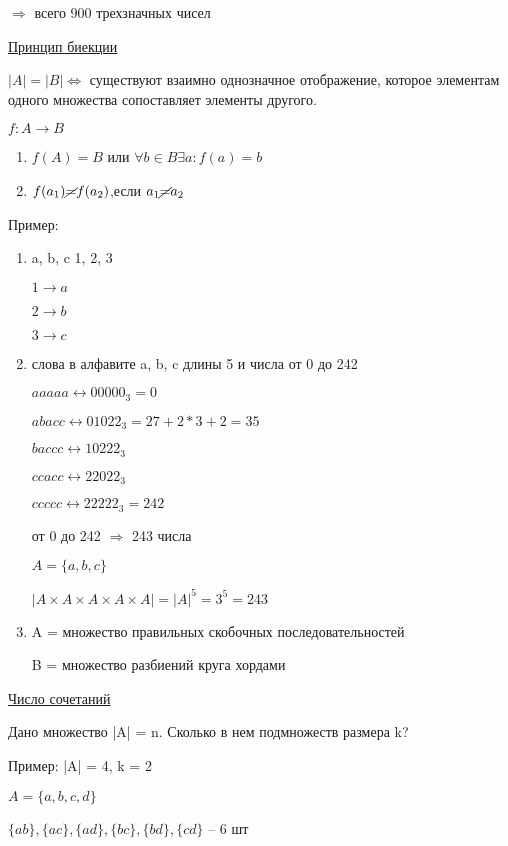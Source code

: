 \documentclass{article}
\begin{document}
$\Rightarrow$	всего 900 трехзначных чисел



\underline{Принцип биекции}

$|A| = |B|  \Leftrightarrow$  существуют взаимно однозначное отображение, которое элементам одного множества сопоставляет элементы другого.

$f:   A \rightarrow B$ 
\begin{enumerate}
	\item $f(A)= B$ или $\forall b\in B \exists a : f(a) = b$
	\item $f(a_1 ) \cancel = f(a_2 )$,если $a_1 \cancel = a_2$  
\end{enumerate}


Пример:
\begin{enumerate}
\item  {a, b, c} {1, 2, 3}

$1 \rightarrow a $

$2 \rightarrow b $

$3 \rightarrow c $

\item 	слова в алфавите a, b, c длины 5 и числа от 0 до 242

 $aaaaa \leftrightarrow 00000_3 = 0$
 
$abacc \leftrightarrow 01022_3 = 27 + 2 \ast 3 + 2 = 35 $

$baccc \leftrightarrow 10222_3 $

$ccacc \leftrightarrow 22022_3  $

$ccccc \leftrightarrow 22222_3 = 242 $

от 0 до 242 $\Rightarrow$  243 числа 

$A = \{a, b, c\}$

$|A \times A \times A \times A \times A|=|A|^5= 3^5=243 $

\item A = множество правильных скобочных последовательностей

B = множество разбиений круга хордами

\end{enumerate}

\underline{Число сочетаний}

Дано множество |A| = n. Сколько в нем подмножеств размера k?

Пример: |A| = 4, k = 2

$A = \{a, b, c, d\}$

$\{ab\}, \{ac\}, \{ad\}, \{bc\}, \{bd\}, \{cd\}$ – 6 шт
\end{document}
